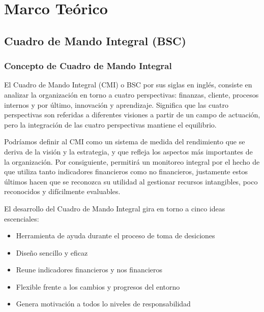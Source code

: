 \documentclass[preprint,12pt]{elsarticle}
\begin{document}


\section{Marco Teórico}

	\subsection{\textbf{Cuadro de Mando Integral (BSC)}}
	
\subsubsection{\textbf{Concepto de Cuadro de Mando Integral}}

El Cuadro de Mando Integral (CMI) o BSC por sus siglas en inglés, consiste en analizar la organización en torno a cuatro perspectivas: finanzas, cliente, procesos internos y por último, innovación y aprendizaje. Significa que las cuatro perspectivas son referidas a diferentes visiones a partir de un campo de actuación, pero la integración de las cuatro perspectivas mantiene el equilibrio.


Podríamos definir al CMI como un sistema de medida del rendimiento que se deriva de la visión y la estrategia, y que refleja los aspectos más importantes de la organización. Por consiguiente, permitirá un monitoreo integral por el hecho de que utiliza tanto indicadores financieros como no financieros, justamente estos últimos hacen que se reconozca su utilidad al gestionar recursos intangibles, poco reconocidos y difícilmente evaluables. \cite{referenciaestrella1} 

El desarrollo del Cuadro de Mando Integral gira en torno a cinco ideas escenciales:  

	\begin{itemize}
		\item Herramienta de ayuda durante el proceso de toma de desiciones
		\item Diseño sencillo y eficaz
		\item Reune indicadores financieros y nos financieros
		\item Flexible frente a los cambios y progresos del entorno
		\item Genera motivación a todos lo niveles de responsabilidad \cite{referenciaestrella3} 
	\end{itemize}
\end{document}
